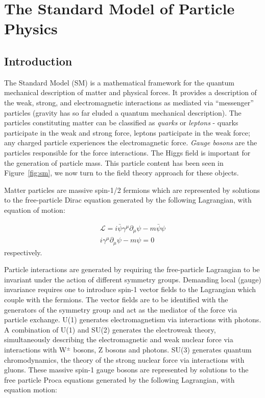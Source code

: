 \chapter{The Standard Model of Particle Physics}
\label{chap:sm}

\section{Introduction}

The Standard Model (SM) is a mathematical framework for the quantum mechanical description of matter and physical forces. It provides a description of the weak, strong, and electromagnetic interactions as mediated via ``messenger'' particles (gravity has so far eluded a quantum mechanical description). The particles constituting matter can be classified as \textit{quarks} or \textit{leptons} - quarks participate in the weak and strong force, leptons participate in the weak force; any charged particle experiences the electromagnetic force. \textit{Gauge bosons} are the particles responsible for the force interactions. The Higgs field is important for the generation of particle mass. This particle content has been seen in Figure~\ref{fig:sm}, we now turn to the field theory approach for these objects.

Matter particles are massive spin-1/2 fermions which are represented by solutions to the free-particle Dirac equation generated by the following Lagrangian, with equation of motion:

\begin{equation}
\begin{array}{l}
\mathcal{L} = i\bar{\psi}\gamma^{\mu}\partial_{\mu}\psi - m\bar{\psi}\psi\\
i\gamma^{\mu}\partial_{\mu}\psi - m\psi = 0
\end{array}
\end{equation}
respectively.

Particle interactions are generated by requiring the free-particle Lagrangian to be invariant under the action of different symmetry groups. Demanding local (gauge) invariance requires one to introduce spin-1 vector fields to the Lagrangian which couple with the fermions. The vector fields are to be identified with the generators of the symmetry group and act as the mediator of the force via particle exchange. U(1) generates electromagnetism via interactions with photons. A combination of U(1) and SU(2) generates the electroweak theory, simultaneously describing the electromagnetic and weak nuclear force via interactions with W$^{\pm}$ bosons, Z bosons and photons. SU(3) generates quantum chromodynamics, the theory of the strong nuclear force via interactions with gluons. These massive spin-1 gauge bosons are represented by solutions to the free particle Proca equations generated by the following Lagrangian, with equation motion:

